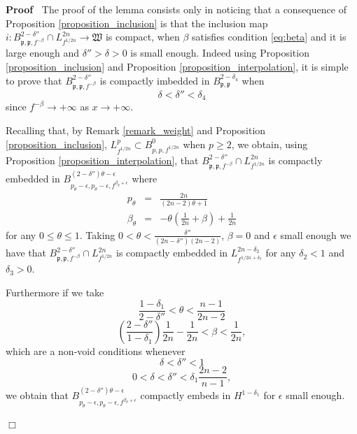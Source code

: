 \documentclass[a4paper,10pt]{article}
\newenvironment{proof}{\noindent\textbf{Proof\ }}{\hspace*{\fill}$\Box$\medskip}
\begin{document}
\begin{proof}
  The proof of the lemma consists only in noticing that a consequence of
  Proposition \ref{proposition_inclusion} is that the inclusion map $i : B^{2
  - \delta''}_{\mathfrak{p}, \mathfrak{p,} f^{- \beta}} \cap L^{2 n}_{f^{1 / 2
  n}} \rightarrow \mathfrak{W}$ is compact, when $\beta$ satisfies condition
  {\eqref{eq:beta}} and it is large enough and $\delta'' > \delta > 0$ is
  small enough. Indeed using Proposition \ref{proposition_inclusion} and
  Proposition \ref{proposition_interpolation}, it is simple to prove that
  $B^{2 - \delta''}_{\mathfrak{p}, \mathfrak{p,} f^{- \beta}}$ is compactly
  imbedded in $B^{2 - \delta_4}_{\mathfrak{p}, \mathfrak{p}}$ when
  \begin{equation}
    \delta < \delta'' < \delta_4 \label{eq:delta1}
  \end{equation}
  since $f^{- \beta} \rightarrow + \infty$ as $x \rightarrow + \infty$.
  
  Recalling that, by Remark \ref{remark_weight} and Proposition
  \ref{proposition_inclusion}, $L^p_{f^{1 / 2 n}} \subset B^0_{p, p, f^{1 / 2
  n}}$ when $p \geqslant 2$, we obtain, using Proposition
  \ref{proposition_interpolation}, that $B^{2 - \delta''}_{\mathfrak{p},
  \mathfrak{p,} f^{- \beta}} \cap L^{2 n}_{f^{1 / 2 n}}$ is compactly embedded
  in $B^{(2 - \delta'') \theta - \epsilon}_{p_{\theta} - \epsilon, p_{\theta}
  - \epsilon, f^{\beta_{\theta} + \epsilon}}$ where
  \begin{eqnarray}
    p_{\theta} & = & \frac{2 n}{(2 n - 2) \theta + 1} \nonumber\\
    \beta_{\theta} & = & - \theta \left( \frac{1}{2 n} + \beta \right) +
    \frac{1}{2 n} \nonumber
  \end{eqnarray}
  for any $0 \leqslant \theta \leqslant 1$. Taking $0 < \theta <
  \frac{\delta''}{(2 n - \delta'') (2 n - 2)}$, $\beta = 0$ and $\epsilon$
  small enough we have that $B^{2 - \delta''}_{\mathfrak{p}, \mathfrak{p,}
  f^{- \beta}} \cap L^{2 n}_{f^{1 / 2 n}}$ is compactly embedded in $L^{2 n -
  \delta_2}_{f^{1 / 2 n + \delta_3}}$ for any $\delta_2 < 1$ and $\delta_3 >
  0$.
  
  Furthermore if we take
  \[ \frac{1 - \delta_1}{2 - \delta''} < \theta < \frac{n - 1}{2 n - 2} \]
  \[ \left( \frac{2 - \delta''}{1 - \delta_1} \right) \frac{1}{2 n} -
     \frac{1}{2 n} < \beta < \frac{1}{2 n}, \]
  which are a non-void conditions whenever
  \begin{equation}
    \delta < \delta'' < 1 \label{eq:delta2}
  \end{equation}
  \begin{equation}
    0 < \delta < \delta'' < \delta_1 \frac{2 n - 2}{n - 1} \label{eq:delta3},
  \end{equation}
  we obtain that $B^{(2 - \delta'') \theta - \epsilon}_{p_{\theta} - \epsilon,
  p_{\theta} - \epsilon, f^{\beta_{\theta} + \epsilon}}$ compactly embeds in
  $H^{1 - \delta_1}$ for $\epsilon$ small enough.
  

\end{proof}
\end{document}
